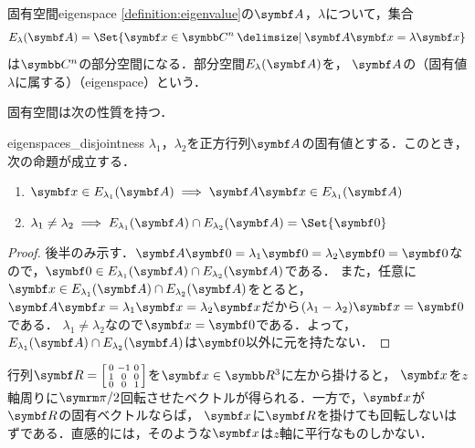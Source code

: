 \documentclass[../../main]{subfiles}
\begin{document}
\begin{definition}{固有空間}{eigenspace}
  \cref{definition:eigenvalue}の\(\mat{A}\)，\(\lambda\)について，集合
  \[
    E_\lambda(\mat{A}) = \Set{\vect{x}\in\numset{C}^n\given\mat{A}\vect{x}=\lambda\vect{x}}
  \]
  は\(\numset{C}^n\)の部分空間になる．部分空間\(E_\lambda(\mat{A})\)を，
  \(\mat{A}\)の（固有値\(\lambda\)に属する）（eigenspace）という．
\end{definition}

固有空間は次の性質を持つ．

\begin{proposition}{}{eigenspaces_disjointness}
  \(\lambda_1\)，\(\lambda_2\)を正方行列\(\mat{A}\)の固有値とする．このとき，次の命題が成立する．
  \begin{enumerate}
    \item \(\vect{x}\in E_{\lambda_1}(\mat{A})\implies\mat{A}\vect{x}\in E_{\lambda_1}(\mat{A})\)
    \item \(\lambda_1\neq\lambda_2\implies E_{\lambda_1}(\mat{A})\cap E_{\lambda_2}(\mat{A})=\Set{\zvec}\)
  \end{enumerate}
\end{proposition}
\begin{proof}
  後半のみ示す．\(\mat{A}\zvec=\lambda_1\zvec=\lambda_2\zvec=\zvec\)なので，\(\zvec\in E_{\lambda_1}(\mat{A})\cap E_{\lambda_2}(\mat{A})\)である．
  また，任意に\(\vect{x}\in E_{\lambda_1}(\mat{A})\cap E_{\lambda_2}(\mat{A})\)をとると，\(\mat{A}\vect{x}=\lambda_1\vect{x}=\lambda_2\vect{x}\)だから\((\lambda_1-\lambda_2)\vect{x}=\zvec\)である．
  \(\lambda_1\neq\lambda_2\)なので\(\vect{x}=\zvec\)である．よって，\(E_{\lambda_1}(\mat{A})\cap E_{\lambda_2}(\mat{A})\)は\(\zvec\)以外に元を持たない．
\end{proof}

\begin{example}
  行列\(\mat{R}=\begin{bsmallmatrix}0 & -1 & 0 \\ 1 & 0 & 0 \\ 0 & 0 & 1\end{bsmallmatrix}\)を\(\vect{x}\in\numset{R}^3\)に左から掛けると，
  \(\vect{x}\)を\(z\)軸周りに\(\krez/2\)回転させたベクトルが得られる．一方で，\(\vect{x}\)が\(\mat{R}\)の固有ベクトルならば，
  \(\vect{x}\)に\(\mat{R}\)を掛けても回転しないはずである．直感的には，そのような\(\vect{x}\)は\(z\)軸に平行なものしかない．
\end{example}
\end{document}
